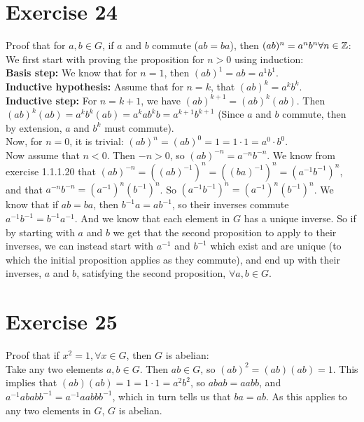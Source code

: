 \documentclass[12pt]{article}
\begin{document}
    
    \section*{Exercise 24}
    Proof that for $a, b \in G$,
    if $a$ and $b$ commute ($ab = ba$),
    then $(ab)^n = a^nb^n \forall n \in \mathbb{Z}$: \\
    We first start with proving the proposition for $n > 0$ using induction: \\
    \textbf{Basis step:}
    We know that for $n = 1$, then $(ab)^1 = ab = a^1b^1$. \\
    \textbf{Inductive hypothesis:}
    Assume that for $n = k$, that $(ab)^k = a^kb^k$. \\
    \textbf{Inductive step:}
    For $n = k + 1$, we have $(ab)^{k+1} = (ab)^k(ab)$.
    Then $(ab)^k(ab) = a^kb^k(ab) = a^kab^kb = a^{k+1}b^{k+1}$
    (Since $a$ and $b$ commute,
    then by extension, $a$ and $b^k$ must commute). \\
    Now, for $n = 0$, it is trivial:
    $(ab)^n = (ab)^0 = 1 = 1 \cdot 1 = a^0 \cdot b^0$. \\
    Now assume that $n < 0$.
    Then $-n > 0$,
    so $(ab)^{-n} = a^{-n}b^{-n}$.
    We know from exercise 1.1.1.20 that $(ab)^{-n}
    = ((ab)^{-1})^n
    = ((ba)^{-1})^n
    = (a^{-1}b^{-1})^n$,
    and that $a^{-n}b^{-n} = (a^{-1})^n(b^{-1})^n$.
    So $(a^{-1}b^{-1})^n = (a^{-1})^n(b^{-1})^n$.
    We know that if $ab = ba$,
    then $b^{-1}a = ab^{-1}$,
    so their inverses commute $a^{-1}b^{-1} = b^{-1}a^{-1}$.
    And we know that each element in $G$ has a unique inverse.
    So if by starting with $a$ and $b$
    we get that the second proposition to apply to their inverses,
    we can instead start with $a^{-1}$ and $b^{-1}$ which exist and are unique
    (to which the initial proposition applies as they commute),
    and end up with their inverses, $a$ and $b$, satisfying the second
    proposition, $\forall a, b \in G$.


    \section*{Exercise 25}
    Proof that if $x^2 = 1, \forall x \in G$,
    then $G$ is abelian: \\
    Take any two elements $a, b \in G$.
    Then $ab \in G$,
    so $(ab)^2 = (ab)(ab) = 1$.
    This implies that $(ab)(ab) = 1 = 1 \cdot 1 = a^2b^2$,
    so $abab = aabb$,
    and $a^{-1}ababb^{-1} = a^{-1}aabbb^{-1}$,
    which in turn tells us that $ba = ab$.
    As this applies to any two elements in $G$, $G$ is abelian.
\end{document}
